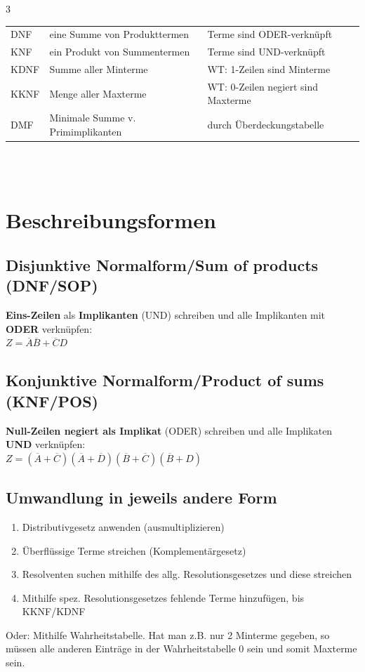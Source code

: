 \documentclass[6pt,a4paper]{scrartcl}
\newcommand{\ol}[1]{\ensuremath{\overline{#1}}}									%
\begin{document}
\begin{multicols*}{3}
	\begin{tabular}{l|l|l}
		DNF  & eine Summe von Produkttermen      & Terme sind ODER-verknüpft          \\
		KNF  & ein Produkt von Summentermen      & Terme sind UND-verknüpft           \\
		KDNF & Summe aller Minterme              & WT: 1-Zeilen sind Minterme         \\
		KKNF & Menge aller Maxterme              & WT: 0-Zeilen negiert sind Maxterme \\
		DMF  & Minimale Summe v. Primimplikanten & durch Überdeckungstabelle          \\
	\end{tabular}
	\\ \\

	\section{Beschreibungsformen}
	\subsection{Disjunktive Normalform/Sum of products (DNF/SOP)}
	\textbf{Eins-Zeilen} als \textbf{Implikanten} (UND) schreiben und alle Implikanten mit \textbf{ODER} verknüpfen: \\
	$Z = \overline A \overline B + \overline C D$

	\subsection{Konjunktive Normalform/Product of sums (KNF/POS)}
	\textbf{Null-Zeilen negiert als Implikat} (ODER)  schreiben und alle Implikaten \textbf{UND} verknüpfen: \\
	$Z = ( \ol A + \ol C) ( \ol A + \ol D) ( \ol B + \ol C) ( \ol B + D)$

	\subsection{Umwandlung in jeweils andere Form}
	\begin{enumerate}
		\item Distributivgesetz anwenden (ausmultiplizieren)
		\item Überflüssige Terme streichen (Komplementärgesetz)
		\item Resolventen suchen mithilfe des allg. Resolutionsgesetzes und diese streichen
		\item Mithilfe spez. Resolutionsgesetzes fehlende Terme hinzufügen, bis KKNF/KDNF
	\end{enumerate}
	Oder: Mithilfe Wahrheitstabelle. Hat man z.B. nur 2 Minterme gegeben, so müssen alle anderen Einträge in der Wahrheitstabelle 0 sein und somit Maxterme sein.


\end{multicols*}
\end{document}
